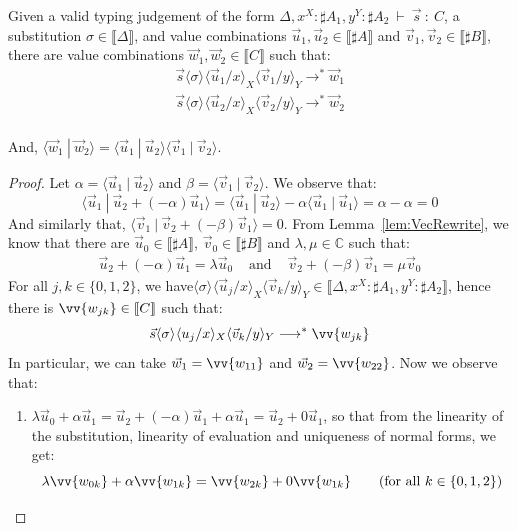 \documentclass[a4paper,UKenglish,numberwithinsect,pdfa,anonymous]{lipics-v2021}
\theoremstyle{restatestyle}
\newcommand\lra{\longrightarrow}
\newcommand\ansubst[2]{\ensuremath{\langle #1 \rangle_{#2}}}
\def\C{\mathbb{C}}            %
\def\scal#1#2{\langle{#1}~|~{#2}\rangle}
\def\eval{\lra^*}
\def\sem#1{\llbracket#1\rrbracket}
\def\TYP#1#2#3{#1~{\vdash}~#2~{:}~#3}
\begin{document}
\begin{lemma}\label{lem:UnitPreserTens} %
Given a valid typing judgement of the form $\TYP{\Delta,x^{X}:\sharp A_1, y^{Y}:\sharp A_2}{\vec{s}}{C}$, a substitution $\sigma\in\sem{\Delta}$, and value combinations $\vec{u}_{1},\vec{u}_{2}\in\sem{\sharp A}$ and $\vec{v}_{1},\vec{v}_{2}\in\sem{\sharp B}$, there are value combinations $\vec{w}_{1},\vec{w}_{2}\in\sem{C}$ such that:
\[
\begin{array}{c}
    \vec{s}\ansubst{\sigma}{}\ansubst{\vec{u}_{1}/x}{X}{\ansubst{\vec{v}_{1}/y}{Y}}\eval\vec{w}_{1}\\
    \vec{s}\ansubst{\sigma}{}\ansubst{\vec{u}_{2}/x}{X}{\ansubst{\vec{v}_{2}/y}{Y}}\eval\vec{w}_{2}\\
\end{array}
\]

And, $\scal{\vec{w}_{1}}{\vec{w}_{2}} = \scal{\vec{u}_{1}}{\vec{u}_{2}} \scal{\vec{v}_{1}}{\vec{v}_{2}}$.

\begin{proof}
    Let $\alpha=\scal{\vec{u}_{1}}{\vec{u}_{2}}$ and $\beta=\scal{\vec{v}_{1}}{\vec{v}_{2}}$. We observe that:
    \[
    \scal{\vec{u}_{1}}{\vec{u}_{2}+(-\alpha)\vec{u}_{1}} = \scal{\vec{u}_{1}}{\vec{u}_{2}} - \alpha \scal{\vec{u}_{1}}{\vec{u}_{1}} = \alpha - \alpha = 0
    \]
    And similarly that, $\scal{\vec{v}_{1}}{\vec{v}_{2}+ (-\beta) \vec{v}_{1}} = 0$. From Lemma~\ref{lem:VecRewrite}, we know that there are $\vec{u}_{0}\in\sem{\sharp A}$, $\vec{v}_{0}\in\sem{\sharp B}$ and $\lambda,\mu\in\C$ such that:
    \begin{align*}
        \vec{u}_{2} +(-\alpha)\vec{u}_{1} = \lambda\vec{u}_{0}& \text{ and } & \vec{v}_{2} + (-\beta)\vec{v}_{1} = \mu\vec{v}_{0} 
    \end{align*}
    For all $j,k\in\{0,1,2\}$, we have$\ansubst{\sigma}{}\ansubst{\vec{u}_{j}/x}{X}\ansubst{\vec{v}_{k}/y}{Y}\in\sem{\Delta,x^{X}:\sharp A_1, y^{Y}:\sharp A_2}$, hence there is $\vv{w_{jk}}\in\sem{C}$ such that:
    \[
    \vec{s}\ansubst{\sigma}{}\ansubst{u_j/x}{X}\ansubst{\vec{v}_{k}/y}{Y}\eval\vv{w_{jk}}
    \]
    In particular, we can take $\vec{w}_{1}=\vv{w_{11}}$ and $\vec{w}_{2}=\vv{w_{22}}$. Now we observe that:
    \begin{enumerate}
        \item\label{A9:it1} $\lambda \vec{u}_{0} + \alpha\vec{u}_{1}=\vec{u}_{2} + (-\alpha) \vec{u}_{1} + \alpha \vec{u}_{1} = \vec{u}_{2} + 0 \vec{u}_{1}$, so that from the linearity of the substitution, linearity of evaluation and uniqueness of normal forms, we get:
        \[
        \lambda\vv{w_{0k}} + \alpha \vv{w_{1k}} = \vv{w_{2k}} + 0 \vv{w_{1k}} \qquad(\text{for all }k\in\{0,1,2\})
        \]
        

\end{enumerate}
\end{proof}
\end{lemma}
\end{document}

